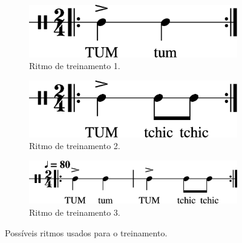 \begin{figure}[ht]
\centering
\begin{subfigure}{.475\textwidth}
  \centering
  \includegraphics[width=.9\linewidth]{chapters/cap-musicalidade/timing0-1.eps}  
  \caption{Ritmo de treinamento 1.}
  \label{fig:ex:timing:a}
\end{subfigure}
\hfill	
\begin{subfigure}{.475\textwidth}
  \centering
  \includegraphics[width=.9\linewidth]{chapters/cap-musicalidade/timing1-1.eps}  
  \caption{Ritmo de treinamento 2.}
  \label{fig:ex:timing:b}
\end{subfigure}
\begin{subfigure}{.675\textwidth}
  \centering
  \includegraphics[width=.9\linewidth]{chapters/cap-musicalidade/timing2-1.eps}  
  \caption{Ritmo de treinamento 3.}
  \label{fig:ex:timing:c}
\end{subfigure}
\caption{Possíveis ritmos usados para o treinamento.}
\label{fig:ex:timing}
\end{figure}

